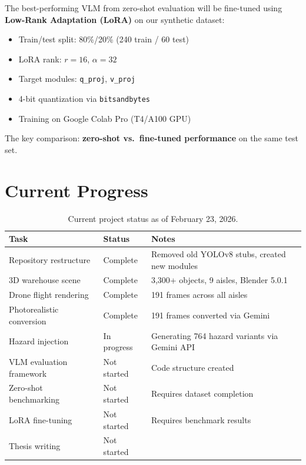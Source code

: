 \documentclass[12pt, a4paper]{article}
\begin{document}
The best-performing VLM from zero-shot evaluation will be fine-tuned using \textbf{Low-Rank Adaptation (LoRA)} on our synthetic dataset:

\begin{itemize}
    \item Train/test split: 80\%/20\% (240 train / 60 test)
    \item LoRA rank: $r = 16$, $\alpha = 32$
    \item Target modules: \texttt{q\_proj}, \texttt{v\_proj}
    \item 4-bit quantization via \texttt{bitsandbytes}
    \item Training on Google Colab Pro (T4/A100 GPU)
\end{itemize}

The key comparison: \textbf{zero-shot vs.\ fine-tuned performance} on the same test set.

\section{Current Progress}

\begin{table}[h]
\centering
\begin{tabular}{lll}
\toprule
\textbf{Task} & \textbf{Status} & \textbf{Notes} \\
\midrule
Repository restructure & Complete & Removed old YOLOv8 stubs, created new modules \\
3D warehouse scene & Complete & 3,300+ objects, 9 aisles, Blender 5.0.1 \\
Drone flight rendering & Complete & 191 frames across all aisles \\
Photorealistic conversion & Complete & 191 frames converted via Gemini \\
Hazard injection & In progress & Generating 764 hazard variants via Gemini API \\
VLM evaluation framework & Not started & Code structure created \\
Zero-shot benchmarking & Not started & Requires dataset completion \\
LoRA fine-tuning & Not started & Requires benchmark results \\
Thesis writing & Not started &\\
\bottomrule
\end{tabular}
\caption{Current project status as of February 23, 2026.}
\end{table}
\end{document}
